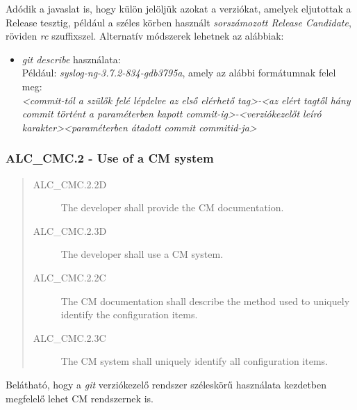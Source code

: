 Adódik a javaslat is, hogy külön jelöljük azokat a verziókat, amelyek eljutottak a Release tesztig,
például a széles körben használt \emph{sorszámozott Release Candidate}, röviden \emph{rc}
szuffixszel.
Alternatív módszerek lehetnek az alábbiak:
\begin{itemize}
    \item \emph{git describe} használata: \\
        Például: \emph{syslog-ng-3.7.2-834-gdb3795a}, amely az alábbi formátumnak felel meg: \\
        \emph{<commit-tól a szülők felé lépdelve az első elérhető tag>-<az elért tagtől hány commit
            történt a paraméterben kapott commit-ig>-<verziókezelőt leíró karakter><paraméterben
        átadott commit commitid-ja>}
\end{itemize}

\pagebreak[3]
\subsubsection{ALC\_CMC.2 - Use of a CM system}

\begin{quote}
    \begin{description}
        \item[ALC\_CMC.2.2D]{The developer shall provide the CM documentation.}
        \item[ALC\_CMC.2.3D]{The developer shall use a CM system.}
        \item[ALC\_CMC.2.2C]{The CM documentation shall describe the method used to uniquely
            identify the configuration items.}
        \item[ALC\_CMC.2.3C]{The CM system shall uniquely identify all configuration items.}
    \end{description}
\end{quote}
Belátható, hogy a \emph{git} verziókezelő rendszer széleskörű használata kezdetben megfelelő
lehet CM rendszernek is.

\pagebreak[1]
